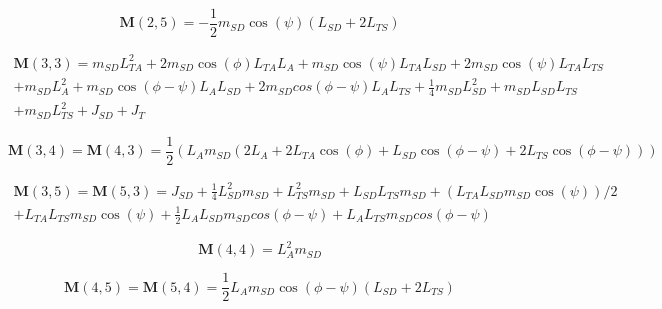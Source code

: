 \begin{linenomath*}
    \begin{equation}
        \mathbf{M}(2,5) = -\frac{1}{2}m_{SD}\cos(\psi)(L_{SD} + 2L_{TS})
    \end{equation}
\end{linenomath*}
\begin{linenomath*}
    \vspace{-20pt}
    \begin{multline}
        \mathbf{M}(3,3) = m_{SD}L_{TA}^2 + 2m_{SD}\cos(\phi)L_{TA}L_{A} + m_{SD}\cos(\psi)L_{TA}L_{SD} + 2m_{SD}\cos(\psi)L_{TA}L_{TS}\\ + m_{SD}L_{A}^2 + m_{SD}\cos(\phi - \psi)L_{A}L_{SD} + 2m_{SD}cos(\phi - \psi)L_{A}L_{TS} + \frac{1}{4}m_{SD}L_{SD}^2 + m_{SD}L_{SD}L_{TS}\\ + m_{SD}L_{TS}^2 + J_{SD} + J_T
    \end{multline}
\end{linenomath*}
\begin{linenomath*}
    \begin{equation}
        \mathbf{M}(3,4) = \mathbf{M}(4,3) = \frac{1}{2}(L_{A}m_{SD}(2L_{A} + 2L_{TA}\cos(\phi) + L_{SD}\cos(\phi - \psi) + 2L_{TS}\cos(\phi - \psi)))
    \end{equation}
\end{linenomath*}
\begin{linenomath*}
    \vspace{-20pt}
    \begin{multline}
        \mathbf{M}(3,5) = \mathbf{M}(5,3) = J_{SD} + \frac{1}{4}L_{SD}^2m_{SD} + L_{TS}^2m_{SD} + L_{SD}L_{TS}m_{SD} + (L_{TA}L_{SD}m_{SD}\cos(\psi))/2\\ + L_{TA}L_{TS}m_{SD}\cos(\psi) + \frac{1}{2}L_{A}L_{SD}m_{SD}cos(\phi - \psi) + L_{A}L_{TS}m_{SD}cos(\phi - \psi)
    \end{multline}
\end{linenomath*}
\begin{linenomath*}
    \begin{equation}
        \mathbf{M}(4,4) = L_{A}^2m_{SD}
    \end{equation}
\end{linenomath*}
\begin{linenomath*}
    \begin{equation}
        \mathbf{M}(4,5) = \mathbf{M}(5,4) = \frac{1}{2}L_{A}m_{SD}\cos(\phi - \psi)(L_{SD} + 2L_{TS})
    \end{equation}
\end{linenomath*}
